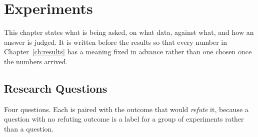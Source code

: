 \chapter{Experiments}
\label{ch:experiments}

This chapter states what is being asked, on what data, against what, and how an
answer is judged. It is written before the results so that every number in
Chapter~\ref{ch:results} has a meaning fixed in advance rather than one chosen
once the numbers arrived.

\section{Research Questions}
\label{sec:exp-rq}

Four questions. Each is paired with the outcome that would \emph{refute} it,
because a question with no refuting outcome is a label for a group of
experiments rather than a question.

